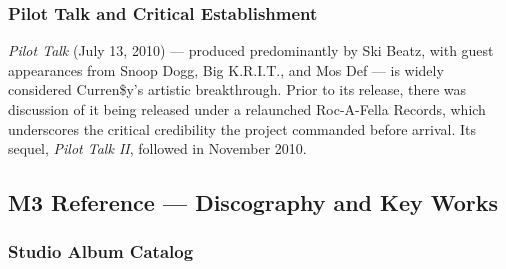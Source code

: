 \documentclass[11pt,letterpaper]{article}
\begin{document}
\subsubsection{Pilot Talk and Critical Establishment}

\textit{Pilot Talk} (July 13, 2010) — produced predominantly by Ski Beatz, with guest appearances from Snoop Dogg, Big K.R.I.T., and Mos Def — is widely considered Curren\$y's artistic breakthrough. Prior to its release, there was discussion of it being released under a relaunched Roc-A-Fella Records, which underscores the critical credibility the project commanded before arrival. Its sequel, \textit{Pilot Talk II}, followed in November 2010.

\subsection{M3 Reference — Discography and Key Works}

\subsubsection{Studio Album Catalog}
\end{document}
